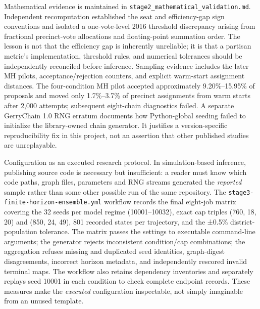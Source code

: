 \documentclass[
  10pt,
]{article}
\begin{document}
Mathematical evidence is maintained in
\texttt{stage2\_mathematical\_validation.md}. Independent recomputation
established the seat and efficiency-gap sign conventions and isolated a
one-vote-level 2016 threshold discrepancy arising from fractional
precinct-vote allocations and floating-point summation order. The lesson
is not that the efficiency gap is inherently unreliable; it is that a
partisan metric's implementation, threshold rules, and numerical
tolerances should be independently reconciled before inference. Sampling
evidence includes the later MH pilots, acceptance/rejection counters,
and explicit warm-start assignment distances. The four-condition MH
pilot accepted approximately 9.20\%--15.95\% of proposals and moved only
1.7\%--3.7\% of precinct assignments from warm starts after 2,000
attempts; subsequent eight-chain diagnostics failed. A separate
GerryChain 1.0 RNG erratum documents how Python-global seeding failed to
initialize the library-owned chain generator. It justifies a
version-specific reproducibility fix in this project, not an assertion
that other published studies are unreplayable.

Configuration as an executed research protocol. In simulation-based
inference, publishing source code is necessary but insufficient: a
reader must know which code paths, graph files, parameters and RNG
streams generated the \emph{reported} sample rather than some other
possible run of the same repository. The
\texttt{stage3-finite-horizon-ensemble.yml} workflow records the final
eight-job matrix covering the 32 seeds per model regime (10001--10032),
exact cap triples (760, 18, 20) and (850, 24, 49), 801 recorded states
per trajectory, and the ±0.5\% district-population tolerance. The matrix
passes the settings to executable command-line arguments; the generator
rejects inconsistent condition/cap combinations; the aggregation refuses
missing and duplicated seed identities, graph-digest disagreements,
incorrect horizon metadata, and independently rescored invalid terminal
maps. The workflow also retains dependency inventories and separately
replays seed 10001 in each condition to check complete endpoint records.
These measures make the \emph{executed} configuration inspectable, not
simply imaginable from an unused template.
\end{document}
